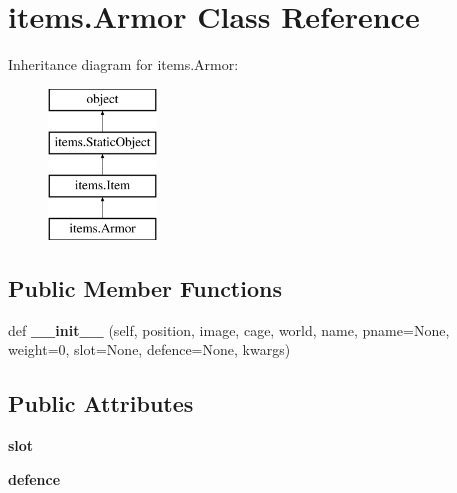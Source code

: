 \hypertarget{classitems_1_1_armor}{}\section{items.\+Armor Class Reference}
\label{classitems_1_1_armor}
Inheritance diagram for items.\+Armor\+:\begin{figure}[H]
\begin{center}
\leavevmode
\includegraphics[height=4.000000cm]{classitems_1_1_armor}
\end{center}
\end{figure}
\subsection*{Public Member Functions}
\begin{DoxyCompactItemize}
\item 
\hypertarget{classitems_1_1_armor_ad101fea5a3cd4517f86014e7e32dbaf9}{}def {\bfseries \+\_\+\+\_\+init\+\_\+\+\_\+} (self, position, image, cage, world, name, pname=None, weight=0, slot=None, defence=None, kwargs)\label{classitems_1_1_armor_ad101fea5a3cd4517f86014e7e32dbaf9}

\end{DoxyCompactItemize}
\subsection*{Public Attributes}
\begin{DoxyCompactItemize}
\item 
\hypertarget{classitems_1_1_armor_a9e657d008f23e31e8bbb95073108d9ee}{}{\bfseries slot}\label{classitems_1_1_armor_a9e657d008f23e31e8bbb95073108d9ee}

\item 
\hypertarget{classitems_1_1_armor_a7cbb8ddcc295c0508f3a60d28cd655e6}{}{\bfseries defence}\label{classitems_1_1_armor_a7cbb8ddcc295c0508f3a60d28cd655e6}

\end{DoxyCompactItemize}
